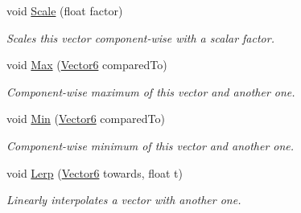 \begin{DoxyCompactItemize}
void \hyperlink{class_grid_framework_1_1_vectors_1_1_vector6_a7ec5913250e83dbc213856475df38970_a7ec5913250e83dbc213856475df38970}{Scale} (float factor)
\begin{DoxyCompactList}\small\item\em Scales this vector component-\/wise with a scalar factor.\end{DoxyCompactList}\item 
void \hyperlink{class_grid_framework_1_1_vectors_1_1_vector6_a4db5e65c63eee368eb69b61e7135f356_a4db5e65c63eee368eb69b61e7135f356}{Max} (\hyperlink{class_grid_framework_1_1_vectors_1_1_vector6}{Vector6} compared\+To)
\begin{DoxyCompactList}\small\item\em Component-\/wise maximum of this vector and another one.\end{DoxyCompactList}\item 
void \hyperlink{class_grid_framework_1_1_vectors_1_1_vector6_a8356582db024654c8694fd46cbfa86b3_a8356582db024654c8694fd46cbfa86b3}{Min} (\hyperlink{class_grid_framework_1_1_vectors_1_1_vector6}{Vector6} compared\+To)
\begin{DoxyCompactList}\small\item\em Component-\/wise minimum of this vector and another one.\end{DoxyCompactList}\item 
void \hyperlink{class_grid_framework_1_1_vectors_1_1_vector6_aae1062c3a23d64c883bd7890e67b9b48_aae1062c3a23d64c883bd7890e67b9b48}{Lerp} (\hyperlink{class_grid_framework_1_1_vectors_1_1_vector6}{Vector6} towards, float t)
\begin{DoxyCompactList}\small\item\em Linearly interpolates a vector with another one.\end{DoxyCompactList}\end{DoxyCompactItemize}
